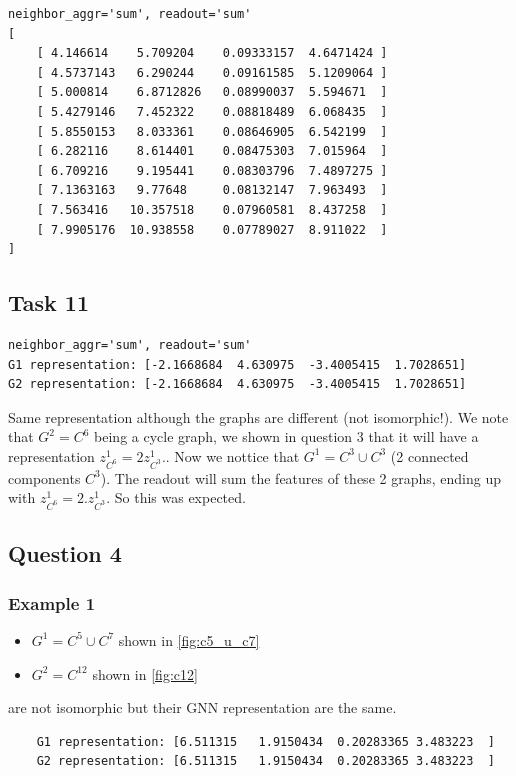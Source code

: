 \documentclass[a4paper]{article}
\begin{document}
\begin{verbatim}
neighbor_aggr='sum', readout='sum'
[
    [ 4.146614    5.709204    0.09333157  4.6471424 ]
    [ 4.5737143   6.290244    0.09161585  5.1209064 ]
    [ 5.000814    6.8712826   0.08990037  5.594671  ]
    [ 5.4279146   7.452322    0.08818489  6.068435  ]
    [ 5.8550153   8.033361    0.08646905  6.542199  ]
    [ 6.282116    8.614401    0.08475303  7.015964  ]
    [ 6.709216    9.195441    0.08303796  7.4897275 ]
    [ 7.1363163   9.77648     0.08132147  7.963493  ]
    [ 7.563416   10.357518    0.07960581  8.437258  ]
    [ 7.9905176  10.938558    0.07789027  8.911022  ]
]      
\end{verbatim}

\subsection*{Task 11}
\begin{verbatim}
neighbor_aggr='sum', readout='sum'
G1 representation: [-2.1668684  4.630975  -3.4005415  1.7028651]
G2 representation: [-2.1668684  4.630975  -3.4005415  1.7028651]
\end{verbatim}
Same representation although the graphs are different (not isomorphic!).
We note that $G^2 =C^6$ being a cycle graph, we shown in question 3 that it will have a representation $z^{1}_{C^6} = 2 z^{1}_{C^3}$..
Now we nottice that $G^{1} = C^3 \cup C^3$ (2 connected components $C^3$). The readout will sum the features of these 2 graphs,
ending up with $z^{1}_{C^6} = 2. z^{1}_{C^3}$.
So this was expected.


\subsection*{Question 4}
\subsubsection*{Example 1}
\begin{itemize}
    \item $G^1 =C^5 \cup C^7$ shown in \ref{fig:c5_u_c7}
    \item $G^2 =C^{12}$ shown in \ref{fig:c12}
\end{itemize} 
are not isomorphic but their GNN representation are the same.

\begin{verbatim}
    G1 representation: [6.511315   1.9150434  0.20283365 3.483223  ]
    G2 representation: [6.511315   1.9150434  0.20283365 3.483223  ]
\end{verbatim}
\end{document}
